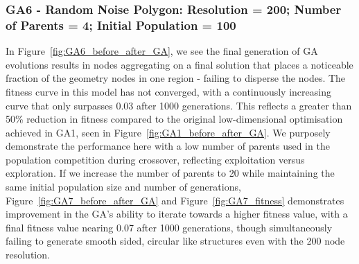 \documentclass{article}
\begin{document}
\subsubsection*{GA6 - Random Noise Polygon: Resolution = 200; Number of Parents = 4; Initial Population = 100}

In Figure~\ref{fig:GA6_before_after_GA}, we see the final generation of GA evolutions results in nodes aggregating on a final solution that places a noticeable fraction of the geometry nodes in one region - failing to disperse the nodes. The fitness curve in this model has not converged, with a continuously increasing curve that only surpasses 0.03 after 1000 generations. This reflects a greater than 50\% reduction in fitness compared to the original low-dimensional optimisation achieved in GA1, seen in Figure~\ref{fig:GA1_before_after_GA}. We purposely demonstrate the performance here with a low number of parents used in the population competition during crossover, reflecting exploitation versus exploration. If we increase the number of parents to 20 while maintaining the same initial population size and number of generations, Figure~\ref{fig:GA7_before_after_GA} and Figure~\ref{fig:GA7_fitness} demonstrates improvement in the GA's ability to iterate towards a higher fitness value, with a final fitness value nearing 0.07 after 1000 generations, though simultaneously failing to generate smooth sided, circular like structures even with the 200 node resolution.
\end{document}
